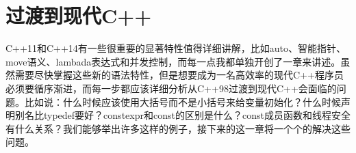 \chapter{过渡到现代C++}
C++11和C++14有一些很重要的显著特性值得详细讲解，比如auto、智能指针、move语义、lambada表达式和并发控制，而每一点我都单独开创了一章来讲述。虽然需要尽快掌握这些新的语法特性，但是想要成为一名高效率的现代C++程序员必须要循序渐进，而每一步都应该详细分析从C++98过渡到现代C++会面临的问题。比如说：什么时候应该使用大括号而不是小括号来给变量初始化？什么时候声明别名比typedef要好？constexpr和const的区别是什么？const成员函数和线程安全有什么关系？我们能够举出许多这样的例子，接下来的这一章将一个个的解决这些问题。


